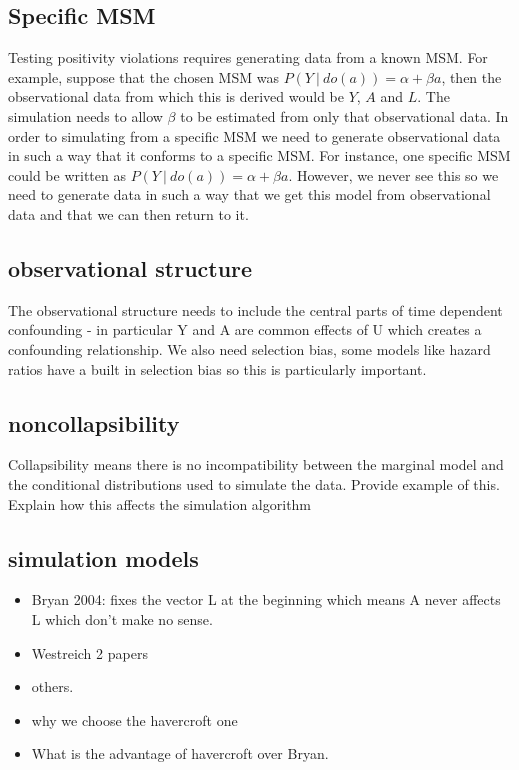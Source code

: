 \documentclass[11pt]{article}
\begin{document}
\subsection{Specific MSM}\label{specific-msm}

Testing positivity violations requires generating data from a known MSM.
For example, suppose that the chosen MSM was
\(P(Y\ |\ do(a)) = \alpha + \beta a\), then the observational data from
which this is derived would be \(Y\), \(A\) and \(L\). The simulation
needs to allow \(\beta\) to be estimated from only that observational
data. In order to simulating from a specific MSM we need to generate
observational data in such a way that it conforms to a specific MSM. For
instance, one specific MSM could be written as
\(P(Y\ |\ do(a)) = \alpha + \beta a\). However, we never see this so we
need to generate data in such a way that we get this model from
observational data and that we can then return to it.

\subsection{observational structure}\label{observational-structure}

The observational structure needs to include the central parts of time
dependent confounding - in particular Y and A are common effects of U
which creates a confounding relationship. We also need selection bias,
some models like hazard ratios have a built in selection bias so this is
particularly important.

\subsection{noncollapsibility}\label{noncollapsibility}

Collapsibility means there is no incompatibility between the marginal
model and the conditional distributions used to simulate the data.
Provide example of this. Explain how this affects the simulation
algorithm

\subsection{simulation models}\label{simulation-models}

\begin{itemize}
\item
  Bryan 2004: fixes the vector L at the beginning which means A never
  affects L which don't make no sense.
\item
  Westreich 2 papers
\item
  others.
\item
  why we choose the havercroft one
\item
  What is the advantage of havercroft over Bryan.
\end{itemize}
\end{document}
